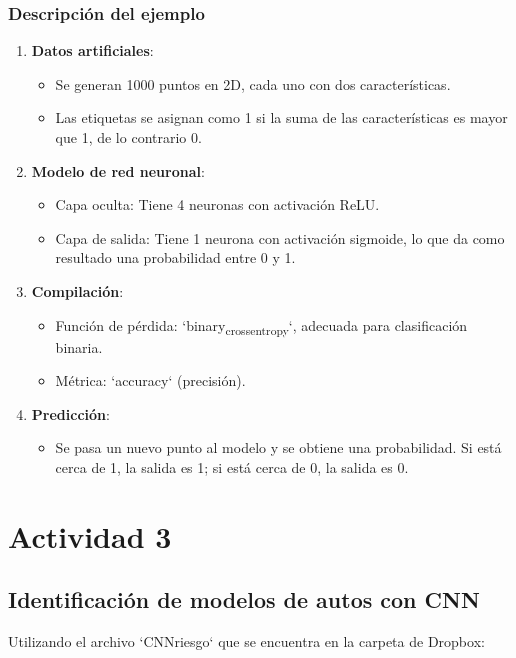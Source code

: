 \documentclass[11pt]{article}
\begin{document}
\subsubsection*{Descripción del ejemplo}
\label{sec:org83bcc4a}
\begin{enumerate}
\item \textbf{\textbf{Datos artificiales}}:
\begin{itemize}
\item Se generan 1000 puntos en 2D, cada uno con dos características.
\item Las etiquetas se asignan como 1 si la suma de las características es mayor que 1, de lo contrario 0.
\end{itemize}
\item \textbf{\textbf{Modelo de red neuronal}}:
\begin{itemize}
\item Capa oculta: Tiene 4 neuronas con activación ReLU.
\item Capa de salida: Tiene 1 neurona con activación sigmoide, lo que da como resultado una probabilidad entre 0 y 1.
\end{itemize}
\item \textbf{\textbf{Compilación}}:
\begin{itemize}
\item Función de pérdida: `binary\textsubscript{crossentropy}`, adecuada para clasificación binaria.
\item Métrica: `accuracy` (precisión).
\end{itemize}
\item \textbf{\textbf{Predicción}}:
\begin{itemize}
\item Se pasa un nuevo punto al modelo y se obtiene una probabilidad. Si está cerca de 1, la salida es 1; si está cerca de 0, la salida es 0.
\end{itemize}
\end{enumerate}

\section*{Actividad 3}
\label{sec:org2ef69c3}
\subsection*{Identificación de modelos de autos con CNN}
\label{sec:orgdf7f651}
Utilizando el archivo `CNNriesgo` que se encuentra en la carpeta de Dropbox:
\end{document}
